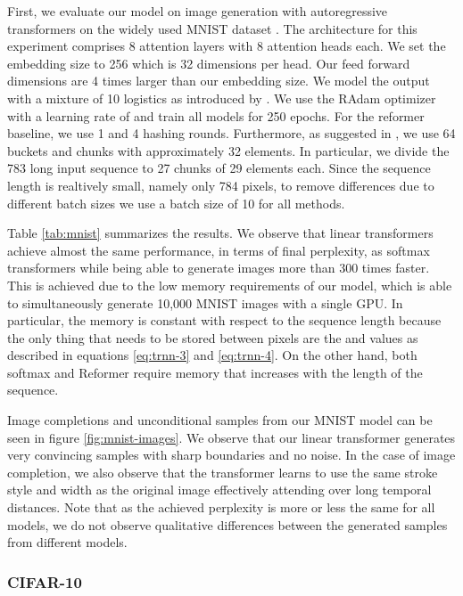 \documentclass{article}
\begin{document}
First, we evaluate our model on image generation with autoregressive
transformers on the widely used MNIST dataset \cite{lecun2010mnist}. The
architecture for this experiment comprises 8 attention layers with 8 attention
heads each. We set the embedding size to 256 which is 32 dimensions per head.
Our feed forward dimensions are 4 times larger than our embedding size. We
model the output with a mixture of 10 logistics as introduced by
\citet{salimans2017pixelcnn++}. We use the RAdam optimizer with a learning rate
of  and train all models for 250 epochs. For the reformer baseline, we
use 1 and 4 hashing rounds. Furthermore, as suggested in
\citet{kitaev2020reformer}, we use 64 buckets and chunks with approximately 32
elements. In particular, we divide the 783 long input sequence to 27 chunks of
29 elements each. Since the sequence length is realtively small, namely only
784 pixels, to remove differences due to different batch sizes we use a batch
size of 10 for all methods.

Table \ref{tab:mnist} summarizes the results. We observe that linear
transformers achieve almost the same performance, in terms of final perplexity,
as softmax transformers while being able to generate images more than 300 times
faster. This is achieved due to the low memory requirements of our model, which
is able to simultaneously generate 10,000 MNIST images with a single GPU. In
particular, the memory is constant with respect to the sequence length because
the only thing that needs to be stored between pixels are the  and 
values as described in equations \ref{eq:trnn-3} and \ref{eq:trnn-4}. On the
other hand, both softmax and Reformer require memory that increases with the
length of the sequence.

Image completions and unconditional samples from our MNIST model can be seen in
figure \ref{fig:mnist-images}. We observe that our linear transformer generates
very convincing samples with sharp boundaries and no noise. In the
case of image completion, we also observe that the transformer learns to use
the same stroke style and width as the original image effectively attending
over long temporal distances. Note that as the achieved perplexity is more or
less the same for all models, we do not observe qualitative differences between
the generated samples from different models.

\subsubsection{CIFAR-10} \label{sec:exp-cifar}
\end{document}
